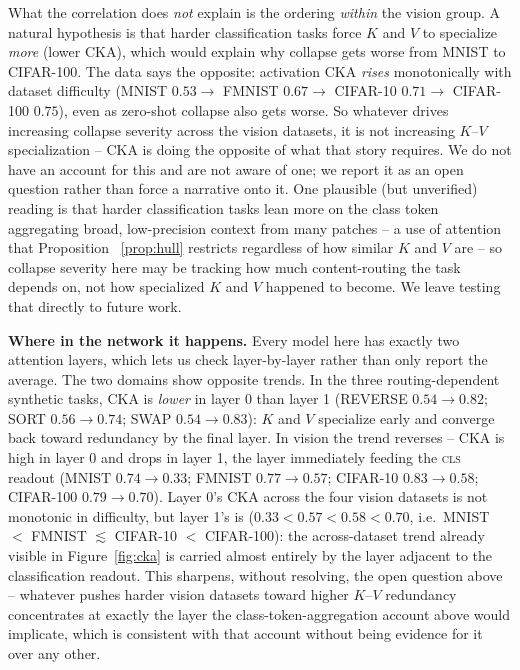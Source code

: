 \documentclass[11pt]{article}
\begin{document}
What the correlation does \emph{not} explain is the ordering \emph{within} the vision
group. A natural hypothesis is that harder classification tasks force $K$ and $V$ to
specialize \emph{more} (lower CKA), which would explain why collapse gets worse from
MNIST to CIFAR-100. The data says the opposite: activation CKA \emph{rises}
monotonically with dataset difficulty (MNIST $0.53 \to$ FMNIST $0.67 \to$ CIFAR-10
$0.71 \to$ CIFAR-100 $0.75$), even as zero-shot collapse also gets worse. So whatever
drives increasing collapse severity across the vision datasets, it is not increasing
$K$--$V$ specialization -- CKA is doing the opposite of what that story requires. We do
not have an account for this and are not aware of one; we report it as an open
question rather than force a narrative onto it. One plausible (but unverified) reading
is that harder classification tasks lean more on the class token aggregating broad,
low-precision context from many patches -- a use of attention that Proposition~
\ref{prop:hull} restricts regardless of how similar $K$ and $V$ are -- so collapse
severity here may be tracking how much content-routing the task depends on, not how
specialized $K$ and $V$ happened to become. We leave testing that directly to future
work.

\textbf{Where in the network it happens.} Every model here has exactly two attention
layers, which lets us check layer-by-layer rather than only report the average. The
two domains show opposite trends. In the three routing-dependent synthetic tasks, CKA
is \emph{lower} in layer 0 than layer 1 (REVERSE $0.54\to0.82$; SORT $0.56\to0.74$;
SWAP $0.54\to0.83$): $K$ and $V$ specialize early and converge back toward redundancy
by the final layer. In vision the trend reverses -- CKA is high in layer 0 and drops in
layer 1, the layer immediately feeding the \textsc{cls} readout (MNIST
$0.74\to0.33$; FMNIST $0.77\to0.57$; CIFAR-10 $0.83\to0.58$; CIFAR-100
$0.79\to0.70$). Layer 0's CKA across the four vision datasets is not monotonic in
difficulty, but layer 1's is ($0.33 < 0.57 < 0.58 < 0.70$, i.e.\ MNIST $<$ FMNIST
$\lesssim$ CIFAR-10 $<$ CIFAR-100): the across-dataset trend already visible in
Figure~\ref{fig:cka} is carried almost entirely by the layer adjacent to the
classification readout. This sharpens, without resolving, the open question above --
whatever pushes harder vision datasets toward higher $K$--$V$ redundancy concentrates
at exactly the layer the class-token-aggregation account above would implicate, which
is consistent with that account without being evidence for it over any other.
\end{document}
